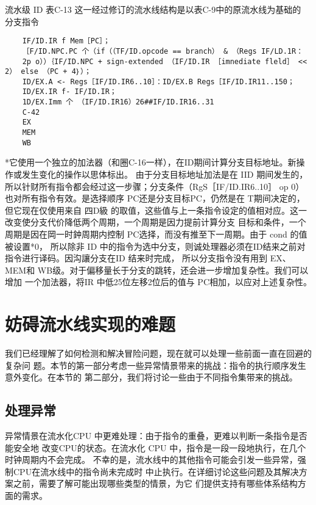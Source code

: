 流水级
ID
表C-13 这一经过修订的流水线结构是以表C-9中的原流水线为基础的
分支指令
\begin{verbatim}
    IF/ID.IR f Mem［PC］；
    ［F/ID.NPC.PC 个（if（（TF/ID.opcode == branch） & （Regs IF/LD.1R：
    2p o））｛IF/ID.NPC + sign-extended （IF/ID.IR ［imnediate fleld］ << 2） else （PC + 4｝）；
    ID/EX.A <- Regs［IF/ID.IR6..10］：ID/EX.B Regs［IF/ID.IR11..150；
    ID/EX.IR f- IF/ID.IR；
    1D/EX.Imm 个 （IF/ID.IR16）26##IF/ID.IR16..31
    C-42
    EX
    MEM
    WB
\end{verbatim}
*它使用一个独立的加法器（和圈C-16一样），在ID期间计算分支目标地址。新操作或发生变化的操作以思体标出。
由于分支目标地址加法是在 IID 期间发生的，所以针财所有指令都会经过这一步骤；分支条件（RgS［IF/ID.IR6..10］
op 0）也对所有指令有效。是选择顺序 PC还是分支目标PC，仍然是在 T期间决定的，但它现在仅使用来自 四D級
的取值，这些值与上一条指令设定的值相对应。这一改变使分支代价降低两个周期，一个周期是因力提前计算分支
目标和条件，一个周期是因在岡一时鈡周期内控制 PC选择，而没有推至下一周期。由于 cond 的值被设置*0，
所以除非 ID 中的指令为选中分支，则诚处理器必须在ID结来之前对指令进行译码。因沟讓分支在ID 结来时完成，
所以分支指令没有用到 EX、MEM和 WB级。对于偏移量长于分支的跳转，还会进一步增加复杂性。我们可以增加
一个加法器，将IR 中低25位左移2位后的值与 PC相加，以应对上述复杂性。

\section{妨碍流水线实现的难题}

我们已经理解了如何检测和解决冒险问题，现在就可以处理一些前面一直在回避的复杂问
题。本节的第一部分考虑一些异常情景带来的挑战：指令的执行顺序发生意外变化。在本节的
第二部分，我们将讨论一些由于不同指令集带来的挑战。

\subsection{处理异常}
异常情景在流水化CPU 中更难处理：由于指令的重叠，更难以判断一条指令是否能安全地
改变CPU的状态。在流水化 CPU 中，指令是一段一段地执行，在几个时钟周期内不会完成。
不幸的是，流水线中的其他指令可能会引发一些异常，强制CPU在流水线中的指令尚未完成时
中止执行。在详细讨论这些问题及其解决方案之前，需要了解可能出现哪些类型的情景，为它
们提供支持有哪些体系结构方面的需求。

